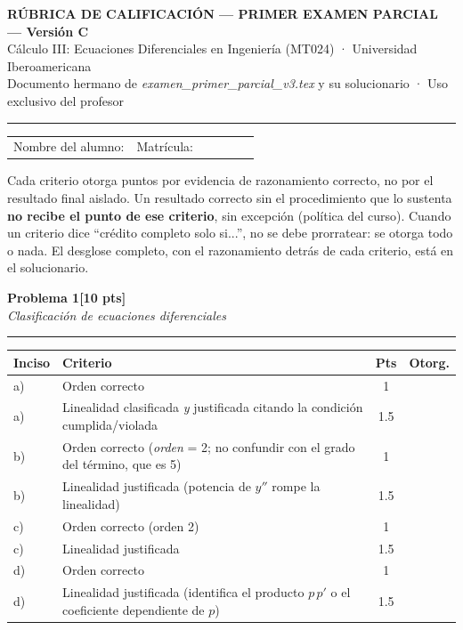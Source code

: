 \documentclass[11pt,letterpaper]{article}
\makeatletter
\newcommand{\problema}[3]{%
  \bigskip\bigskip\noindent
  {\Large\textbf{Problema #1}}\hfill\textbf{[#2 pts]}\\[3pt]
  {\small\itshape #3}\par
  \vspace{2pt}\hrule\vspace{8pt}
}
\newenvironment{tablarubrica}{%
  \begin{tabular}{@{}p{1.1cm}Lcc@{}}
  \toprule
  \textbf{Inciso} & \textbf{Criterio} & \textbf{Pts} & \textbf{Otorg.} \\
  \midrule
}{%
  \bottomrule
  \end{tabular}
}
\makeatother
\begin{document}
\begin{center}
{\Large\bfseries RÚBRICA DE CALIFICACIÓN — PRIMER EXAMEN PARCIAL --- Versión C}\\[2pt]
{\small Cálculo III: Ecuaciones Diferenciales en Ingeniería (MT024) · Universidad Iberoamericana}\\[1pt]
{\small Documento hermano de \textit{examen\_primer\_parcial\_v3.tex} y su solucionario · Uso exclusivo del profesor}
\end{center}

\vspace{4pt}\hrule\vspace{10pt}

\noindent
\begin{tabular}{@{}p{0.5\linewidth}p{0.5\linewidth}@{}}
Nombre del alumno: \dotfill & Matrícula: \dotfill \\[10pt]
\end{tabular}

\vspace{10pt}

 Cada criterio otorga puntos por evidencia de razonamiento correcto, no por el resultado final aislado. Un resultado correcto sin el procedimiento que lo sustenta \textbf{no recibe el punto de ese criterio}, sin excepción (política del curso). Cuando un criterio dice ``crédito completo solo si...'', no se debe prorratear: se otorga todo o nada. El desglose completo, con el razonamiento detrás de cada criterio, está en el solucionario.

\problema{1}{10}{Clasificación de ecuaciones diferenciales}

\begin{tablarubrica}
a) & Orden correcto & 1 & \\
a) & Linealidad clasificada \emph{y} justificada citando la condición cumplida/violada & 1.5 & \\
b) & Orden correcto (\emph{orden} = 2; no confundir con el grado del término, que es 5) & 1 & \\
b) & Linealidad justificada (potencia de $y''$ rompe la linealidad) & 1.5 & \\
c) & Orden correcto (orden 2) & 1 & \\
c) & Linealidad justificada & 1.5 & \\
d) & Orden correcto & 1 & \\
d) & Linealidad justificada (identifica el producto $p\,p'$ o el coeficiente dependiente de $p$) & 1.5 & \\
\end{tablarubrica}
\end{document}
